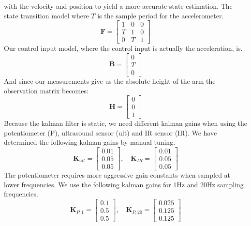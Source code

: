 with the velocity and position to yield a more accurate state estimation.
The state transition model where \(T\) is the sample period for the accelerometer.
\begin{equation*}
	\mathbf{F} = \begin{bmatrix}
		1 & 0 & 0 \\
		T & 1 & 0 \\
		0 & T & 1 
	\end{bmatrix}
\end{equation*}
Our control input model, where the control input is actually the acceleration, is.
\begin{equation*}
	\mathbf{B} = \begin{bmatrix}
		0 \\
		T \\
		0 
	\end{bmatrix}
\end{equation*}
And since our measurements give us the absolute height of the arm the observation matrix becomes:
\begin{equation*}
	\mathbf{H} = \begin{bmatrix}
		0 \\
		0 \\
		1
	\end{bmatrix}
\end{equation*}
Because the kalman filter is static, we need different kalman gains when using the potentiometer (P), ultrasound sensor (ult) and IR sensor (IR).
We have determined the following kalman gains by manual tuning.
\begin{equation*}
	\mathbf{K}_{ult} = \begin{bmatrix}
		0.01 \\
		0.05 \\
		0.05 
	\end{bmatrix}, \quad
	\mathbf{K}_{IR} = \begin{bmatrix}
		0.01 \\
		0.05 \\
		0.05 
	\end{bmatrix}
\end{equation*}
The potentiometer requires more aggressive gain constants when sampled at lower frequencies. We use the following kalman gains for 1Hz
and 20Hz sampling frequencies. 
\begin{equation*}
	\mathbf{K}_{P,1} = \begin{bmatrix}
		0.1 \\
		0.5 \\
		0.5 
	\end{bmatrix},\quad
	\mathbf{K}_{P,20} = \begin{bmatrix}
		0.025 \\
		0.125 \\
		0.125 
	\end{bmatrix}
\end{equation*}

